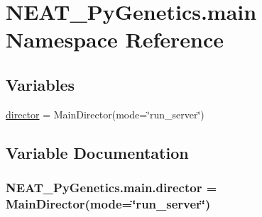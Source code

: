 \hypertarget{namespaceNEAT__PyGenetics_1_1main}{}\section{N\+E\+A\+T\+\_\+\+Py\+Genetics.\+main Namespace Reference}
\label{namespaceNEAT__PyGenetics_1_1main}
\subsection*{Variables}
\begin{DoxyCompactItemize}
\item 
\hyperlink{namespaceNEAT__PyGenetics_1_1main_aa24bf39de8971ca3bfc71b5c764a7c20}{director} = Main\+Director(mode=\char`\"{}run\+\_\+server\char`\"{})
\end{DoxyCompactItemize}


\subsection{Variable Documentation}
\subsubsection[{\texorpdfstring{director}{director}}]{\setlength{\rightskip}{0pt plus 5cm}N\+E\+A\+T\+\_\+\+Py\+Genetics.\+main.\+director = Main\+Director(mode=\char`\"{}run\+\_\+server\char`\"{})}\hypertarget{namespaceNEAT__PyGenetics_1_1main_aa24bf39de8971ca3bfc71b5c764a7c20}{}\label{namespaceNEAT__PyGenetics_1_1main_aa24bf39de8971ca3bfc71b5c764a7c20}
